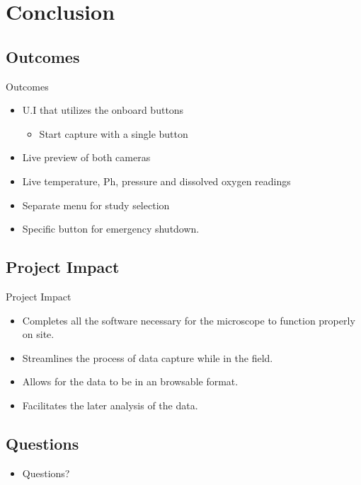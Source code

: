 \documentclass[14pt, aspectratio=169]{beamer}
\begin{document}
\section{Conclusion}
\subsection{Outcomes}
\begin{frame}{Outcomes}
	\begin{itemize}
		\item U.I that utilizes the onboard buttons
		      \begin{itemize}
			      \item Start capture with a single button
		      \end{itemize}
		\item Live preview of both cameras
		\item Live temperature, Ph, pressure and dissolved oxygen readings
		\item Separate menu for study selection
		\item Specific button for emergency shutdown.
	\end{itemize}
\end{frame}
\subsection{Project Impact}
\begin{frame}{Project Impact}
	\begin{itemize}
		\item Completes all the software necessary for the microscope to function properly on site.
		\item Streamlines the process of data capture while in the field.
		\item Allows for the data to be in an browsable format.
		\item Facilitates the later analysis of the data.
	\end{itemize}
\end{frame}
\subsection{Questions}
\begin{frame}
	\begin{itemize}
		\item Questions?
	\end{itemize}
\end{frame}
\end{document}
